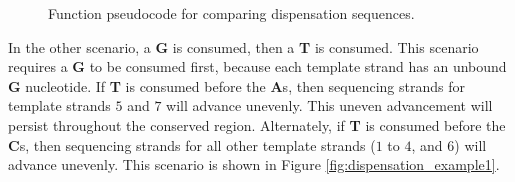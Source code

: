 \documentclass[12pt]{ucthesis}
\begin{document}
      \begin{figure}[!t]
         \centering
         \caption{Function pseudocode for comparing dispensation sequences.}
         \label{fig:compare_sequences}
      \end{figure}

      In the other scenario, a \textbf{G} is consumed, then a \textbf{T} is
      consumed. This scenario requires a \textbf{G} to be consumed first,
      because each template strand has an unbound \textbf{G} nucleotide. If
      \textbf{T} is consumed before the \textbf{A}s, then sequencing strands
      for template strands $5$ and $7$ will advance unevenly. This uneven
      advancement will persist throughout the conserved region. Alternately, if
      \textbf{T} is consumed before the \textbf{C}s, then sequencing strands
      for all other template strands ($1$ to $4$, and $6$) will advance
      unevenly. This scenario is shown in Figure
      \ref{fig:dispensation_example1}.
\end{document}
